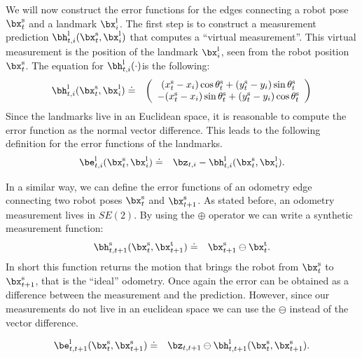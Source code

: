\documentclass[a4paper]{article}
\begin{document}
We will now construct the error functions for the edges connecting a
robot pose $\bx^\mathrm{s}_t$ and a landmark $\bx^\mathrm{l}_i$.  The
first step is to construct a measurement prediction
$\bh^\mathrm{l}_{t,i}(\bx^\mathrm{s}_t, \bx^\mathrm{l}_i)$ that computes
a ``virtual measurement''. This virtual measurement is the position of
the landmark $\bx^\mathrm{l}_i$, seen from the robot position
$\bx^\mathrm{s}_t$. The equation for $\bh^\mathrm{l}_{t,i}(\cdot)$is the
following:
\begin{eqnarray}
    \bh^\mathrm{l}_{t,i}(\bx^\mathrm{s}_t, \bx^\mathrm{l}_i)   & \doteq & 
    \left( 
    \begin{array}{c}
        (x^\mathrm{s}_t - x_i)  \cos \theta^\mathrm{s}_t + (y^\mathrm{s}_t - y_i) \sin \theta^\mathrm{s}_t \\
      - (x^\mathrm{s}_t - x_i)  \sin \theta^\mathrm{s}_t + (y^\mathrm{s}_t - y_i) \cos \theta^\mathrm{s}_t 
    \end{array}
    \right)
\end{eqnarray}
Since the landmarks live in an Euclidean space, it is reasonable to
compute the error function as the normal vector difference.  This
leads to the following definition for the error functions of the
landmarks.
\begin{eqnarray}
    \be^\mathrm{l}_{t,i}(\bx^\mathrm{s}_t, \bx^\mathrm{l}_i)   & \doteq & \bz_{t,i} - \bh^\mathrm{l}_{t,i}(\bx^\mathrm{s}_t, \bx^\mathrm{l}_i).
    \label{eq:landmarkError}
\end{eqnarray}

In a similar way, we can define the error functions of an odometry
edge connecting two robot poses $\bx^\mathrm{s}_t$ and
$\bx^\mathrm{s}_{t+1}$. As stated before, an odometry measurement lives in $SE(2)$.
By using the $\oplus$ operator we can write a synthetic measurement function:
\begin{eqnarray}
    \bh^\mathrm{s}_{t,t+1}(\bx^\mathrm{s}_t, \bx^\mathrm{t}_{t+1})   & \doteq & \bx^\mathrm{s}_{t+1} \ominus \bx^\mathrm{t}_{t}.
\end{eqnarray}
In short this function returns the motion that brings the robot from
$\bx^\mathrm{s}_t$ to $\bx^\mathrm{s}_{t+1}$, that is the ``ideal''
odometry.  Once again the error can be obtained as a difference
between the measurement and the prediction. However, since our measurements
do not live in an euclidean space we can use the $\ominus$ instead of the vector difference.

\begin{eqnarray}
    \be^\mathrm{l}_{t,t+1}(\bx^\mathrm{s}_t, \bx^\mathrm{s}_{t+1})   & \doteq & \bz_{t,t+1} \ominus \bh^\mathrm{l}_{t,t+1}(\bx^\mathrm{s}_t, \bx^\mathrm{s}_{t+1}).
    \label{eq:odometryError}
\end{eqnarray}
\end{document}
